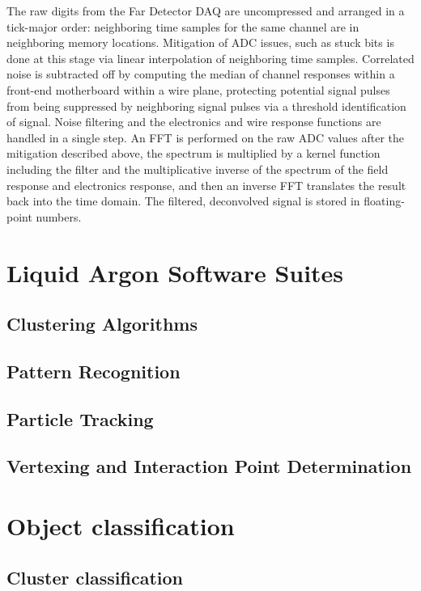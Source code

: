 The raw digits from the Far Detector DAQ are uncompressed and arranged in a tick-major order: neighboring
time samples for the same channel are in neighboring memory locations.  Mitigation of ADC issues, such as
stuck bits is done at this stage via linear interpolation of neighboring time samples.  Correlated noise
is subtracted off by computing the median of channel responses within a front-end motherboard within a wire plane,
protecting potential signal pulses from being suppressed by neighboring signal pulses via a threshold identification
of signal.  Noise filtering and the electronics and wire response functions are handled in a single step.
An FFT is performed on the raw ADC values after the mitigation described above, the spectrum is multiplied by
a kernel function including the filter and the multiplicative inverse of the spectrum of the field response and
electronics response, and then an inverse FFT translates the result back into the time domain.  The filtered,
deconvolved signal is stored in floating-point numbers.

\section{Liquid Argon Software Suites}

\subsection{Clustering Algorithms}
\subsection{Pattern Recognition}
\subsection{Particle Tracking}
\subsection{Vertexing and Interaction Point Determination}

\section{Object classification}
\subsection{Cluster classification}
